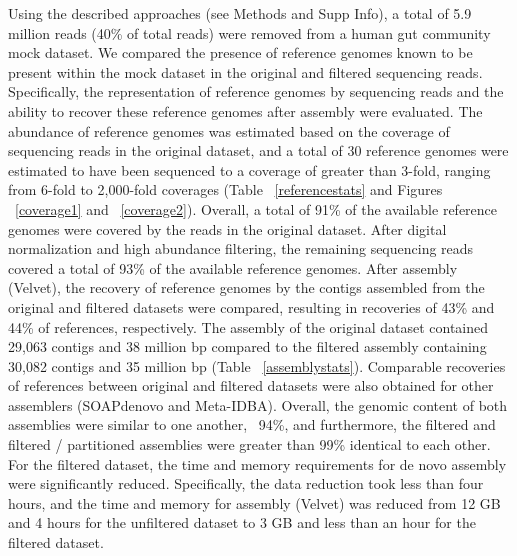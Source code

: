 \documentclass[11pt]{article} %
\begin{document}
Using the described approaches (see Methods and Supp Info), a total of 5.9 million reads (40\% of total reads) were removed from a human gut community mock dataset.   We compared the presence of reference genomes known to be present within the mock dataset  in the original and filtered sequencing reads.  Specifically, the representation of reference genomes by sequencing reads and the ability to recover these reference genomes after assembly were evaluated.   The abundance of reference genomes was estimated based on the coverage of sequencing reads in the original dataset, and a total of 30 reference genomes were estimated to have been sequenced to a coverage of greater than 3-fold, ranging from 6-fold to 2,000-fold coverages (Table ~\ref{referencestats} and Figures ~\ref{coverage1} and ~\ref{coverage2}).  Overall, a total of 91\% of the available reference genomes were covered by the reads in the original dataset.  After digital normalization and high abundance filtering, the remaining sequencing reads covered a total of 93\% of the available reference genomes.   After assembly (Velvet), the recovery of reference genomes by the contigs assembled from the original and filtered datasets were compared, resulting in recoveries of 43\% and 44\% of references, respectively.  The assembly of the original dataset contained 29,063 contigs and 38 million bp compared to the filtered assembly containing 30,082 contigs and 35 million bp (Table ~\ref{assemblystats}).  Comparable recoveries of references between original and filtered datasets were also obtained for other assemblers (SOAPdenovo and Meta-IDBA).   Overall, the genomic content of both assemblies were similar to one another, ~94\%, and furthermore, the filtered and filtered / partitioned assemblies were greater than 99\% identical to each other.  For the filtered dataset, the time and memory requirements for de novo assembly were significantly reduced.  Specifically, the data reduction took less than four hours, and the time and memory for assembly (Velvet) was reduced from 12 GB and 4 hours for the unfiltered dataset to 3 GB and less than an hour for the filtered dataset.   
\end{document}
